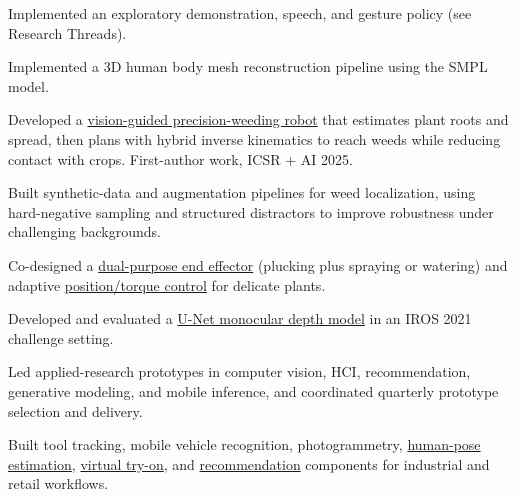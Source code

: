 \documentclass[10pt]{article}
\begin{document}
\begin{compactitems}
\item Implemented an exploratory demonstration, speech, and gesture policy (see Research Threads).
\item Implemented a 3D human body mesh reconstruction pipeline using the SMPL model.
\end{compactitems}
\begin{compactitems}
\item Developed a \href{https://www.researchgate.net/publication/399369200_Vision_Based_Hybrid_IK_Task_Planning_with_Feedforward_Neural_Network_for_Collaborative_Plant-Robot_Interaction_in_Precision_Farming}{vision-guided precision-weeding robot} that estimates plant roots and spread, then plans with hybrid inverse kinematics to reach weeds while reducing contact with crops. First-author work, ICSR + AI 2025.
\item Built synthetic-data and augmentation pipelines for weed localization, using hard-negative sampling and structured distractors to improve robustness under challenging backgrounds.
\item Co-designed a \href{https://github.com/tvpian/Position_Based_Torque_Controller_for_Safe_Robotic_Weeding}{dual-purpose end effector} (plucking plus spraying or watering) and adaptive \href{https://drive.google.com/file/d/1IvKSo8U6aEWXKw8ucpV-9Hd1IqdPomFb/view?usp=sharing}{position/torque control} for delicate plants.
\item Developed and evaluated a \href{https://github.com/tvpian/Monocular_Depth_Estimation_using_Transfer_Learning}{U-Net monocular depth model} in an IROS 2021 challenge setting.
\end{compactitems}
\begin{compactitems}
\item Led applied-research prototypes in computer vision, HCI, recommendation, generative modeling, and mobile inference, and coordinated quarterly prototype selection and delivery.
\item Built tool tracking, mobile vehicle recognition, photogrammetry, \href{https://drive.google.com/file/d/1YryajvaO5w4Blw56dToFsm54rEQHvLkJ/view?usp=sharing}{human-pose estimation}, \href{https://github.com/tvpian/Virtual_Try-On}{virtual try-on}, and \href{https://github.com/tvpian/My-Style}{recommendation} components for industrial and retail workflows.
\end{compactitems}
\end{document}
